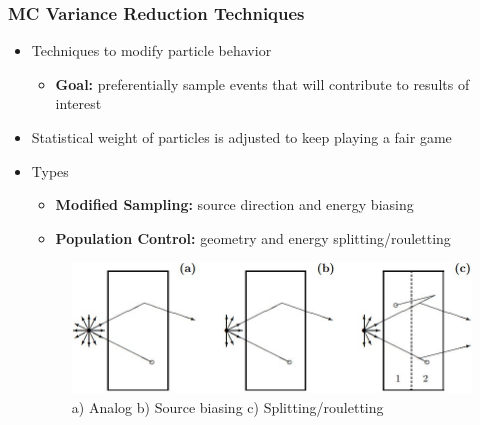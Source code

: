 \documentclass{beamer}
\begin{document}
\begin{frame}
\frametitle{MC Variance Reduction Techniques}
\begin{itemize}
\item{Techniques to modify particle behavior}
   \begin{itemize}
	\item{\textbf{Goal:} preferentially sample events that will contribute to results of interest}
   \end{itemize}
\item{Statistical weight of particles is adjusted to keep playing a fair game}
\item{Types}
	\begin{itemize}
		\item{\textbf{Modified Sampling:} source direction and energy biasing}
		\item{\textbf{Population Control:} geometry and energy
			splitting/rouletting}
	\end{itemize}
                \begin{figure}
			\vspace{0.5cm}
			\hspace{-1cm}
		\includegraphics[scale=0.44]{vr_types.jpg}
			\caption{a) Analog b) Source biasing c)
			Splitting/rouletting}
		\end{figure}
\end{itemize}
\end{frame}
\end{document}
